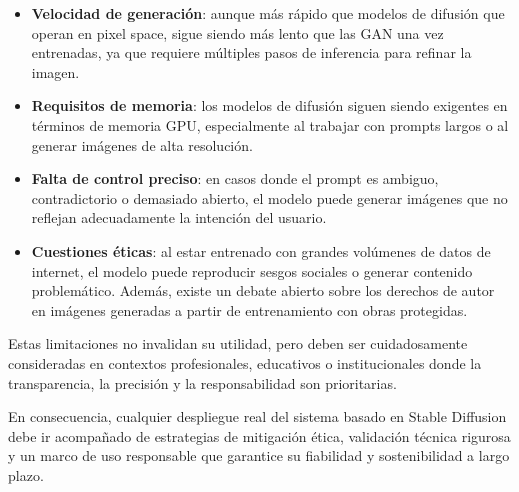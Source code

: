 \begin{itemize}
    \item \textbf{Velocidad de generación}: aunque más rápido que modelos de difusión que operan en pixel space, sigue siendo más lento que las GAN una vez entrenadas, ya que requiere múltiples pasos de inferencia para refinar la imagen.

    \item \textbf{Requisitos de memoria}: los modelos de difusión siguen siendo exigentes en términos de memoria GPU, especialmente al trabajar con prompts largos o al generar imágenes de alta resolución.

    \item \textbf{Falta de control preciso}: en casos donde el prompt es ambiguo, contradictorio o demasiado abierto, el modelo puede generar imágenes que no reflejan adecuadamente la intención del usuario.

    \item \textbf{Cuestiones éticas}: al estar entrenado con grandes volúmenes de datos de internet, el modelo puede reproducir sesgos sociales o generar contenido problemático. Además, existe un debate abierto sobre los derechos de autor en imágenes generadas a partir de entrenamiento con obras protegidas.
\end{itemize}

Estas limitaciones no invalidan su utilidad, pero deben ser cuidadosamente consideradas en contextos profesionales, educativos o institucionales donde la transparencia, la precisión y la responsabilidad son prioritarias. 

En consecuencia, cualquier despliegue real del sistema basado en Stable Diffusion debe ir acompañado de estrategias de mitigación ética, validación técnica rigurosa y un marco de uso responsable que garantice su fiabilidad y sostenibilidad a largo plazo.
